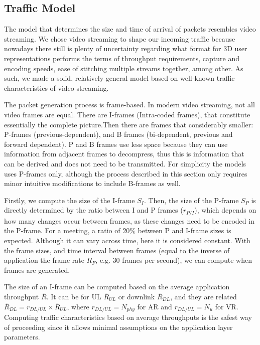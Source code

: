\subsection{Traffic Model}
\label{sec:at}


The model that determines the size and time of arrival of packets resembles video streaming. We chose video streaming to shape our incoming traffic because nowadays there still is plenty of uncertainty regarding what format for 3D user representations performs the terms of throughput requirements, capture and encoding speeds, ease of stitching multiple streams together, among other. As such, we made a solid, relatively general model based on well-known traffic characteristics of video-streaming. 

The packet generation process is frame-based. In modern video streaming, not all video frames are equal. There are I-frames (Intra-coded frames), that constitute essentially the complete picture.Then there are frames that considerably smaller: P-frames (previous-dependent), and B frames (bi-dependent, previous and forward dependent). P and B frames use less space because they can use information from adjacent frames to decompress, thus this is information that can be derived and does not need to be transmitted. For simplicity the models uses P-frames only, although the process described in this section only requires minor intuitive modifications to include B-frames as well.


Firstly, we compute the size of the I-frame $S_I$. Then, the size of the P-frame $S_P$ is directly determined by the ratio between I and P frames ($r_{P/I}$), which depends on how many changes occur between frames, as these changes need to be encoded in the P-frame. For a meeting, a ratio of 20\% between P and I-frame sizes is expected. Although it can vary across time, here it is considered constant. With the frame sizes, and time interval between frames (equal to the inverse of application the frame rate $R_F$, e.g. 30 frames per second), we can compute when frames are generated. 

The size of an I-frame can be computed based on the average application throughput $\overline{R}$. It can be for UL $\overline{R}_{UL}$ or downlink $\overline{R}_{DL}$, and they are related $\overline{R}_{DL} = r_{DL/UL} \times \overline{R}_{UL}$, where $r_{DL/UL} = N_{phy}$ for AR and $r_{DL/UL} = N_{u}$ for VR. Computing traffic characteristics based on average throughputs is the safest way of proceeding since it allows minimal assumptions on the application layer parameters. 

